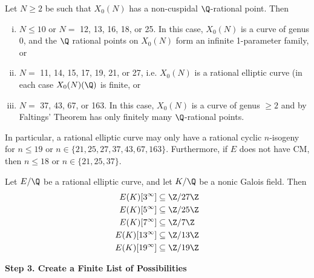 \begin{frame}[plain]
\footnotesize
\begin{thm}
Let $N \geq 2$ be such that $X_0(N)$ has a non-cuspidal $\Q$-rational point. Then
	\begin{enumerate}[(i)]
	\item $N \leq 10$ or $N=$ 12, 13, 16, 18, or 25. In this case, $X_0(N)$ is a curve of genus 0, and the $\Q$ rational points on $X_0(N)$ form an infinite 1-parameter family, or
	\item $N=$ 11, 14, 15, 17, 19, 21, or 27, i.e. $X_0(N)$ is a rational elliptic curve (in each case $X_0(N)(\Q)$ is finite, or
	\item $N=$ 37, 43, 67, or 163. In this case, $X_0(N)$ is a curve of genus $\geq 2$ and by Faltings' Theorem has only finitely many $\Q$-rational points. 
	\end{enumerate}
In particular, a rational elliptic curve may only have a rational cyclic $n$-isogeny for $n \leq 19$ or $n \in \{ 21, 25, 27, 37, 43, 67,163\}$. Furthermore, if $E$ does not have CM, then $n \leq 18$ or $n \in \{ 21, 25, 37 \}$.
\end{thm}
\end{frame}





\begin{frame}[plain,c]

\begin{lem}[M.]
Let $E/\Q$ be a rational elliptic curve, and let $K/\Q$ be a nonic Galois field. Then
	\[
	\begin{aligned}
	E(K)[3^\infty]&\subseteq \Z/27\Z \\
	E(K)[5^\infty]&\subseteq \Z/25\Z \\
	E(K)[7^\infty]&\subseteq \Z/7\Z \\
	E(K)[13^\infty]&\subseteq \Z/13\Z \\
	E(K)[19^\infty]&\subseteq \Z/19\Z
	\end{aligned}
	\]
\end{lem}
\end{frame}





\begin{frame}[plain]
\vfill
\begin{center} {\bfseries \Large \textcolor{UniOrange}{Step 3. Create a Finite List of Possibilities}} \end{center}
\vfill 
\end{frame}





